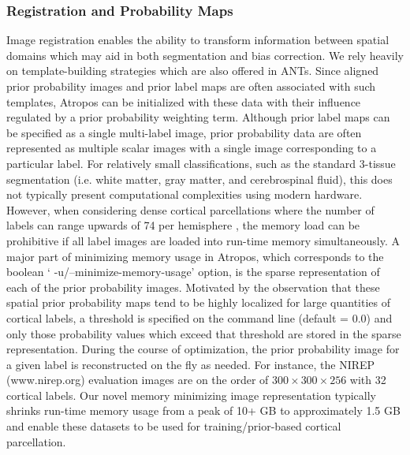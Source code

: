 \documentclass[11pt,english]{article}
\begin{document}
\subsubsection{Registration and Probability Maps} 
Image registration enables the ability to transform information
between spatial domains which may aid in both segmentation and bias
correction.  We rely heavily on template-building strategies
\citep{Avants2010,Avants2010a} which are also offered in ANTs.  Since
aligned prior probability images and prior label maps are often
associated with such templates, Atropos can be initialized with these
data with their influence regulated by a prior probability weighting
term.  Although prior label maps can be specified as a single
multi-label image, prior probability data are often represented as
multiple scalar images with a single image corresponding to a
particular label.  For relatively small classifications, such as the
standard 3-tissue segmentation (i.e. white matter, gray matter, and
cerebrospinal fluid), this does not typically present computational
complexities using modern hardware.  However, when considering dense
cortical parcellations where the number of labels can range upwards of
74 per hemisphere \citep{Destrieux2010}, the memory load can be
prohibitive if all label images are loaded into run-time memory
simultaneously.  A major part of minimizing memory usage in Atropos,
which corresponds to the boolean `{\ttfamily
-u/--minimize-memory-usage}' option, is the sparse representation of
each of the prior probability images.  Motivated by the observation
that these spatial prior probability maps tend to be highly localized
for large quantities of cortical labels, a threshold is specified on
the command line (default = 0.0) and only those probability values
which exceed that threshold are stored in the sparse representation.
During the course of optimization, the prior probability image for a
given label is reconstructed on the fly as needed.  For instance, the
NIREP (www.nirep.org) evaluation images are on the order of $300
\times 300 \times 256$ with 32 cortical labels.  Our novel memory
minimizing image representation typically shrinks run-time memory usage from a
peak of 10+ GB to approximately 1.5 GB and enable these datasets to be
used for training/prior-based cortical parcellation.
\end{document}
